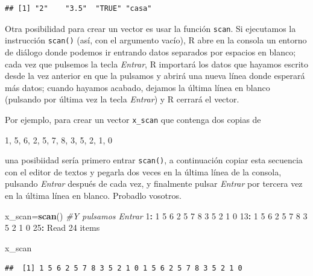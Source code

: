 \documentclass[]{book}
\newenvironment{Shaded}{\begin{snugshade}}{\end{snugshade}}
\newcommand{\CommentTok}[1]{\textcolor[rgb]{0.56,0.35,0.01}{\textit{#1}}}
\newcommand{\DecValTok}[1]{\textcolor[rgb]{0.00,0.00,0.81}{#1}}
\newcommand{\KeywordTok}[1]{\textcolor[rgb]{0.13,0.29,0.53}{\textbf{#1}}}
\newcommand{\NormalTok}[1]{#1}
\newcommand{\OperatorTok}[1]{\textcolor[rgb]{0.81,0.36,0.00}{\textbf{#1}}}
\newcommand{\StringTok}[1]{\textcolor[rgb]{0.31,0.60,0.02}{#1}}
\theoremstyle{definition}
\theoremstyle{definition}
\theoremstyle{definition}
\theoremstyle{remark}
\begin{document}
\begin{verbatim}
## [1] "2"    "3.5"  "TRUE" "casa"
\end{verbatim}

Otra posibilidad para crear un vector es usar la función \texttt{scan}.
Si ejecutamos la instrucción \texttt{scan()} (así, con el argumento vacío), R abre en la consola un entorno de diálogo donde podemos ir entrando datos separados por espacios en blanco; cada vez que pulsemos la tecla \emph{Entrar}, R importará los datos que hayamos escrito desde la vez anterior en que la pulsamos y abrirá una nueva línea donde esperará más datos; cuando hayamos acabado, dejamos la última línea en blanco (pulsando por última vez la tecla \emph{Entrar}) y R cerrará el vector.

Por ejemplo, para crear un vector \texttt{x\_scan} que contenga dos copias de

1, 5, 6, 2, 5, 7, 8, 3, 5, 2, 1, 0

una posibiidad sería primero entrar \texttt{scan()}, a continuación copiar esta secuencia con el editor de textos y pegarla dos veces en la última línea de la consola, pulsando \emph{Entrar} después de cada vez, y finalmente pulsar \emph{Entrar} por tercera vez en la última línea en blanco. Probadlo vosotros.

\begin{Shaded}
\begin{Highlighting}[]
\NormalTok{x_scan=}\KeywordTok{scan}\NormalTok{()  }\CommentTok{#Y pulsamos Entrar}
\DecValTok{1}\OperatorTok{:}\StringTok{ }\DecValTok{1} \DecValTok{5} \DecValTok{6} \DecValTok{2} \DecValTok{5} \DecValTok{7} \DecValTok{8} \DecValTok{3} \DecValTok{5} \DecValTok{2} \DecValTok{1} \DecValTok{0}
\DecValTok{13}\OperatorTok{:}\StringTok{ }\DecValTok{1} \DecValTok{5} \DecValTok{6} \DecValTok{2} \DecValTok{5} \DecValTok{7} \DecValTok{8} \DecValTok{3} \DecValTok{5} \DecValTok{2} \DecValTok{1} \DecValTok{0}
\DecValTok{25}\OperatorTok{:}\StringTok{ }
\NormalTok{Read }\DecValTok{24}\NormalTok{ items}
\end{Highlighting}
\end{Shaded}

\begin{Shaded}
\begin{Highlighting}[]
\NormalTok{x_scan}
\end{Highlighting}
\end{Shaded}

\begin{verbatim}
##  [1] 1 5 6 2 5 7 8 3 5 2 1 0 1 5 6 2 5 7 8 3 5 2 1 0
\end{verbatim}
\end{document}
